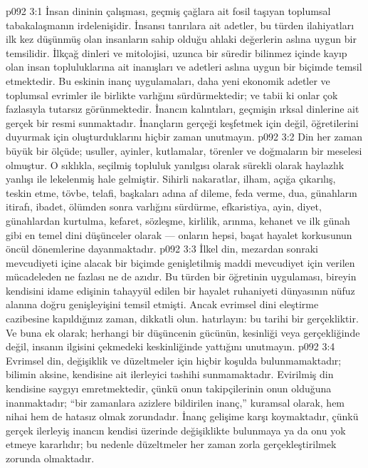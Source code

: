 \vs p092 3:1 İnsan dininin çalışması, geçmiş çağlara ait fosil taşıyan toplumsal tabakalaşmanın irdelenişidir. İnsansı tanrılara ait adetler, bu türden ilahiyatları ilk kez düşünmüş olan insanların sahip olduğu ahlaki değerlerin aslına uygun bir temsilidir. İlkçağ dinleri ve mitolojisi, uzunca bir süredir bilinmez içinde kayıp olan insan topluluklarına ait inanışları ve adetleri aslına uygun bir biçimde temsil etmektedir. Bu eskinin inanç uygulamaları, daha yeni ekonomik adetler ve toplumsal evrimler ile birlikte varlığını sürdürmektedir; ve tabii ki onlar çok fazlasıyla tutarsız görünmektedir. İnancın kalıntıları, geçmişin ırksal dinlerine ait gerçek bir resmi sunmaktadır. İnançların gerçeği keşfetmek için değil, öğretilerini duyurmak için oluşturduklarını hiçbir zaman unutmayın.
\vs p092 3:2 Din her zaman büyük bir ölçüde; usuller, ayinler, kutlamalar, törenler ve doğmaların bir meselesi olmuştur. O sıklıkla, seçilmiş topluluk yanılgısı olarak sürekli olarak haylazlık yanlışı ile lekelenmiş hale gelmiştir. Sihirli nakaratlar, ilham, açığa çıkarılış, teskin etme, tövbe, telafi, başkaları adına af dileme, feda verme, dua, günahların itirafı, ibadet, ölümden sonra varlığını sürdürme, efkaristiya, ayin, diyet, günahlardan kurtulma, kefaret, sözleşme, kirlilik, arınma, kehanet ve ilk günah gibi en temel dini düşünceler olarak --- onların hepsi, başat hayalet korkusunun öncül dönemlerine dayanmaktadır.
\vs p092 3:3 İlkel din, mezardan sonraki mevcudiyeti içine alacak bir biçimde genişletilmiş maddi mevcudiyet için verilen mücadeleden ne fazlası ne de azıdır. Bu türden bir öğretinin uygulaması, bireyin kendisini idame edişinin tahayyül edilen bir hayalet ruhaniyeti dünyasının nüfuz alanına doğru genişleyişini temsil etmişti. Ancak evrimsel dini eleştirme cazibesine kapıldığınız zaman, dikkatli olun.  hatırlayın: bu tarihi bir gerçekliktir. Ve buna ek olarak; herhangi bir düşüncenin gücünün, kesinliği veya gerçekliğinde değil, insanın ilgisini çekmedeki keskinliğinde yattığını unutmayın.
\vs p092 3:4 Evrimsel din, değişiklik ve düzeltmeler için hiçbir koşulda bulunmamaktadır; bilimin aksine, kendisine ait ilerleyici tashihi sunmamaktadır. Evirilmiş din kendisine saygıyı emretmektedir, çünkü onun takipçilerinin onun  olduğuna inanmaktadır; “bir zamanlara azizlere bildirilen inanç,” kuramsal olarak, hem nihai hem de hatasız olmak zorundadır. İnanç gelişime karşı koymaktadır, çünkü gerçek ilerleyiş inancın kendisi üzerinde değişiklikte bulunmaya ya da onu yok etmeye kararlıdır; bu nedenle düzeltmeler her zaman zorla gerçekleştirilmek zorunda olmaktadır.
